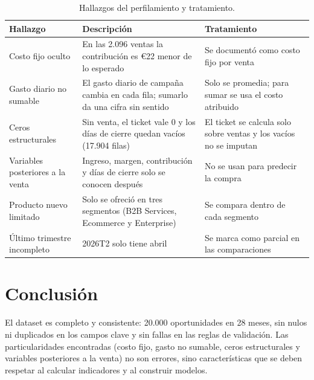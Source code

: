 \documentclass[11pt,letterpaper]{article}
\newcommand{\encabezado}{\rowcolor{mcicCian!15}}
\begin{document}
\begin{table}[H]
\centering\small
\caption{Hallazgos del perfilamiento y tratamiento.}
\begin{tabularx}{\linewidth}{>{\raggedright\arraybackslash}p{3.3cm} L L}
\toprule
\encabezado Hallazgo & Descripción & Tratamiento \\
\midrule
Costo fijo oculto & En las 2.096 ventas la contribución es €22 menor de lo esperado & Se documentó como
costo fijo por venta \\
Gasto diario no sumable & El gasto diario de campaña cambia en cada fila; sumarlo da una cifra sin sentido &
Solo se promedia; para sumar se usa el costo atribuido \\
Ceros estructurales & Sin venta, el ticket vale 0 y los días de cierre quedan vacíos (17.904 filas) & El
ticket se calcula solo sobre ventas y los vacíos no se imputan \\
Variables posteriores a la venta & Ingreso, margen, contribución y días de cierre solo se conocen después &
No se usan para predecir la compra \\
Producto nuevo limitado & Solo se ofreció en tres segmentos (B2B Services, Ecommerce y Enterprise) & Se compara
dentro de cada segmento \\
Último trimestre incompleto & 2026T2 solo tiene abril & Se marca como parcial en las comparaciones \\
\bottomrule
\end{tabularx}
\end{table}

\section{Conclusión}

El dataset es completo y consistente: 20.000 oportunidades en 28 meses, sin nulos ni duplicados en los campos
clave y sin fallas en las reglas de validación. Las particularidades encontradas (costo fijo, gasto no sumable,
ceros estructurales y variables posteriores a la venta) no son errores, sino características que se deben
respetar al calcular indicadores y al construir modelos.
\end{document}

